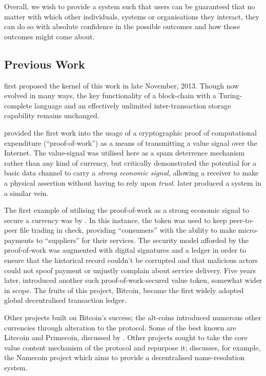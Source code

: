 \documentclass[9pt,oneside]{amsart}
\begin{document}
\begin{multicols}{2}
Overall, we wish to provide a system such that users can be guaranteed that no matter with which other individuals, systems or organisations they interact, they can do so with absolute confidence in the possible outcomes and how those outcomes might come about.

\subsection{Previous Work} \label{ch:previous}

\cite{buterin2013ethereum} first proposed the kernel of this work in late November, 2013. Though now evolved in many ways, the key functionality of a block-chain with a Turing-complete language and an effectively unlimited inter-transaction storage capability remains unchanged.

\cite{dwork92pricingvia} provided the first work into the usage of a cryptographic proof of computational expenditure (``proof-of-work'') as a means of transmitting a value signal over the Internet. The value-signal was utilised here as a spam deterrence mechanism rather than any kind of currency, but critically demonstrated the potential for a basic data channel to carry a \textit{strong economic signal}, allowing a receiver to make a physical assertion without having to rely upon \textit{trust}. \cite{back2002hashcash} later produced a system in a similar vein.

The first example of utilising the proof-of-work as a strong economic signal to secure a currency was by \cite{vishnumurthy03karma:a}. In this instance, the token was used to keep peer-to-peer file trading in check, providing ``consumers'' with the ability to make micro-payments to ``suppliers'' for their services. The security model afforded by the proof-of-work was augmented with digital signatures and a ledger in order to ensure that the historical record couldn't be corrupted and that malicious actors could not spoof payment or unjustly complain about service delivery. Five years later, \cite{nakamoto2008bitcoin} introduced another such proof-of-work-secured value token, somewhat wider in scope. The fruits of this project, Bitcoin, became the first widely adopted global decentralised transaction ledger.

Other projects built on Bitcoin's success; the alt-coins introduced numerous other currencies through alteration to the protocol. Some of the best known are Litecoin and Primecoin, discussed by \cite{sprankel2013technical}. Other projects sought to take the core value content mechanism of the protocol and repurpose it; \cite{aron2012bitcoin} discusses, for example, the Namecoin project which aims to provide a decentralised name-resolution system.


\end{multicols}
\end{document}
